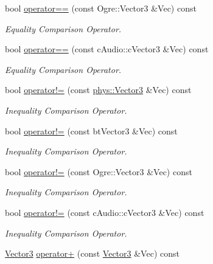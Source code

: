 \begin{DoxyCompactItemize}
bool \hyperlink{classphys_1_1Vector3_aeabe5d949276abe8ea00c8b22b4e652c}{operator==} (const Ogre::Vector3 \&Vec) const 
\begin{DoxyCompactList}\small\item\em Equality Comparison Operator. \item\end{DoxyCompactList}\item 
bool \hyperlink{classphys_1_1Vector3_a858a1ade83b947158eb438dae123b062}{operator==} (const cAudio::cVector3 \&Vec) const 
\begin{DoxyCompactList}\small\item\em Equality Comparison Operator. \item\end{DoxyCompactList}\item 
bool \hyperlink{classphys_1_1Vector3_a9753e8b2540e15f77f724c7882462ce9}{operator!=} (const \hyperlink{classphys_1_1Vector3}{phys::Vector3} \&Vec) const 
\begin{DoxyCompactList}\small\item\em Inequality Comparison Operator. \item\end{DoxyCompactList}\item 
bool \hyperlink{classphys_1_1Vector3_a4c2b4de43118a6fa05288d053f75eb87}{operator!=} (const btVector3 \&Vec) const 
\begin{DoxyCompactList}\small\item\em Inequality Comparison Operator. \item\end{DoxyCompactList}\item 
bool \hyperlink{classphys_1_1Vector3_a8806444791efb7caa9cffc10b4deebef}{operator!=} (const Ogre::Vector3 \&Vec) const 
\begin{DoxyCompactList}\small\item\em Inequality Comparison Operator. \item\end{DoxyCompactList}\item 
bool \hyperlink{classphys_1_1Vector3_a710970ea3bc8322f983ef9be3bd01c82}{operator!=} (const cAudio::cVector3 \&Vec) const 
\begin{DoxyCompactList}\small\item\em Inequality Comparison Operator. \item\end{DoxyCompactList}\item 
\hyperlink{classphys_1_1Vector3}{Vector3} \hyperlink{classphys_1_1Vector3_a982248aea63e87a3163c3b591ab0a225}{operator+} (const \hyperlink{classphys_1_1Vector3}{Vector3} \&Vec) const 

\end{DoxyCompactItemize}
